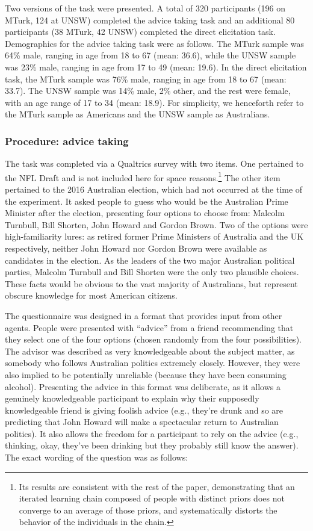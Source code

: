 \documentclass[doc]{apa6}
\begin{document}
Two versions of the task were presented. A total of 320 participants (196 on MTurk, 124 at UNSW) completed the {\sc advice taking} task and an additional 80 participants (38 MTurk, 42 UNSW) completed the {\sc direct elicitation task}. Demographics for the {\sc advice taking} task were as follows. The MTurk sample was 64\% male, ranging in age from 18 to 67 (mean: 36.6), while the UNSW sample was 23\% male, ranging in age from 17 to 49 (mean: 19.6). In the {\sc direct elicitation task}, the MTurk sample was 76\% male, ranging in age from 18 to 67 (mean: 33.7). The UNSW sample was 14\% male, 2\% other, and the rest were female, with an age range of 17 to 34 (mean: 18.9). For simplicity, we henceforth refer to the MTurk sample as Americans and the UNSW sample as Australians.

\bigskip
\subsubsection{Procedure: advice taking}

The task was completed via a Qualtrics survey with two items. One pertained to the NFL Draft and is not included here for space reasons.\footnote{Its results are consistent with the rest of the paper, demonstrating that an iterated learning chain composed of people with distinct priors does not converge to an average of those priors, and systematically distorts the behavior of the individuals in the chain.} The other item pertained to the 2016 Australian election, which had not occurred at the time of the experiment. It asked people to guess who would be the Australian Prime Minister after the election, presenting four options to choose from: Malcolm Turnbull, Bill Shorten, John Howard and Gordon Brown. Two of the options were high-familiarity lures: as retired former Prime Ministers of Australia and the UK respectively, neither John Howard nor Gordon Brown were available as candidates in the election. As the leaders of the two major Australian political parties, Malcolm Turnbull and Bill Shorten were the only two plausible choices. These facts would be obvious to the vast majority of Australians, but represent obscure knowledge for most American citizens.


The questionnaire was designed in a format that provides input from other agents. People were presented with ``advice'' from a friend recommending that they select one of the four options (chosen randomly from the four possibilities). The advisor was described as very knowledgeable about the subject matter, as somebody who follows Australian politics extremely closely. However, they were also implied to be potentially unreliable (because they have been consuming alcohol). Presenting the advice in this format was deliberate, as it allows a genuinely knowledgeable participant to explain why their supposedly knowledgeable friend is giving foolish advice (e.g., they're drunk and so are predicting that John Howard will make a spectacular return to Australian politics). It also allows the freedom for a participant to rely on the advice (e.g., thinking, okay, they've been drinking but they probably still know the answer). The exact wording of the question was as follows:
\end{document}
